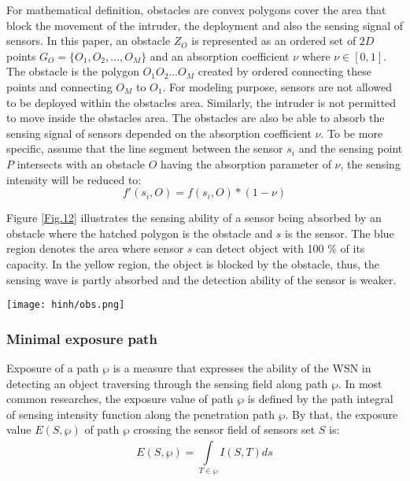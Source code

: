 \documentclass[final]{elsarticle}
\begin{document}
For mathematical definition, obstacles are convex polygons cover the area that block the movement of the intruder, the deployment and also the sensing signal of sensors. In this paper, an obstacle $Z_O$ is represented as an ordered set of $2D$ points $ G_O = \{O_1, O_2,\ldots,O_M\}$ and an absorption coefficient $\nu$ where $\nu \in [0,1]$. The obstacle is the polygon $O_1 O_2\ldots O_M $ created by ordered connecting these points and connecting $O_M$ to $O_1$. For modeling purpose, sensors are not allowed to be deployed within the obstacles area. Similarly, the intruder is not permitted to move inside the obstacles area. The obstacles are also be able to absorb the sensing signal of sensors depended on the absorption coefficient $\nu$. To be more specific, assume that the line segment between the sensor $s_i$ and the sensing point $ P $ intersects with an obstacle $O$ having the absorption parameter of $\nu$, the sensing intensity will be reduced to: 
\begin{equation}
\label{eq5}
f'(s_i,O) = f(s_i,O) * (1-\nu) 
\end{equation}

Figure \ref{Fig.12} illustrates the sensing ability of a sensor being absorbed by an obstacle where the hatched polygon is the obstacle and $ s $  is the sensor. The blue region denotes the area where sensor $ s $ can detect object with 100 \% of its capacity. In the yellow region, the object is blocked by the obstacle, thus, the sensing wave is partly absorbed and the detection ability of the sensor is weaker.
\begin{figure*}[h]
	\centering
	\texttt{[image: hinh/obs.png]}
	\caption{Sensing ability of a sensor being absorbed by an obstacle}
	\label{Fig.12}       %
\end{figure*}
\subsubsection{Minimal exposure path}
Exposure of a path $ \wp $ is a measure that expresses the ability of the WSN in detecting an object traversing through the sensing field along path $ \wp $. In most common researches, the exposure value of path $ \wp $ is defined by the path integral of sensing intensity function along the penetration path $ \wp $. By that, the exposure value $  E(S,\wp ) $ of path $ \wp $ crossing the sensor field of sensors set $ S $ is:
\begin{equation}
\label{eq6}
E(S,\wp ) = \int\limits_{T \in \wp }^{} {I(S, T)} ds
\end{equation}
\end{document}
